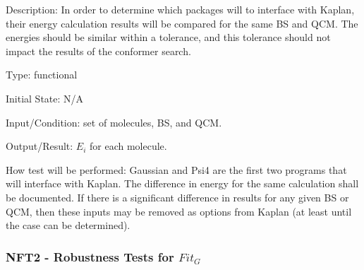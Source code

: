 \documentclass[12pt, titlepage]{article}
\newcommand{\progname}{Kaplan} %
\begin{document}
\begin{enumerate}
Description: In order to determine which packages will to interface with 
\progname{}, their energy calculation results will be compared for the same BS 
and QCM. The energies should be similar within a tolerance, and this tolerance 
should not impact the results of the conformer search.

Type: functional
					
Initial State: N/A
					
Input/Condition: set of molecules, BS, and QCM.
					
Output/Result: $E_i$ for each molecule.
					
How test will be performed: Gaussian and Psi4 are the first two programs that 
will interface with \progname{}. The difference in energy for the same 
calculation shall be documented. If there is a significant difference in 
results for any given BS or QCM, then these inputs may be removed as options 
from \progname{} (at least until the case can be determined).

\end{enumerate}

\subsubsection{NFT2 - Robustness Tests for $Fit_G$}
\end{document}
